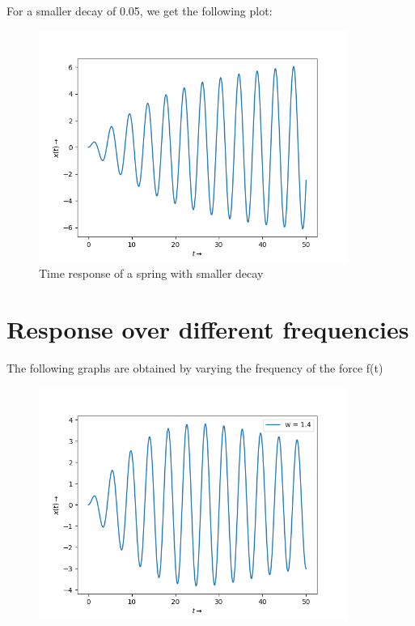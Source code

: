 \documentclass[10pt,a4paper]{article}
\begin{document}
For a smaller decay of 0.05, we get the following plot: \\

\begin{figure}[!tbh]

\includegraphics[width = 0.9\textwidth]{2.png}
\caption{Time response of a spring with smaller decay}

\end{figure}

\section{Response over different frequencies}

The following graphs are obtained by varying the frequency of the force f(t)

\begin{figure}[!tbh]

\includegraphics[width = 0.9\textwidth]{3a.png}

\end{figure}
\end{document}
